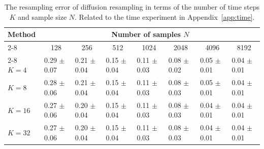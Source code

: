 \documentclass{article}
\begin{document}
\begin{table}[t!]
    \caption{The resampling error of diffusion resampling in terms of the number of time steps $K$ and sample size $N$. 
    Related to the time experiment in Appendix~\ref{app:time}. }
    \label{tbl:time-err-diffres}
    \centering
    \begin{tabular}{@{}llllllll@{}}
    \toprule
     \multirow{2}{*}{Method}  & \multicolumn{7}{c}{Number of samples $N$}                                                                                                                                               \\ \cmidrule(l){2-8} 
           & \multicolumn{1}{c}{128} & \multicolumn{1}{c}{256} & \multicolumn{1}{c}{512} & \multicolumn{1}{c}{1024} & \multicolumn{1}{c}{2048} & \multicolumn{1}{c}{4096} & \multicolumn{1}{c}{8192} \\ \cmidrule(l){2-8} 
    $K=4$  & 0.29 $\pm$ 0.07         & 0.21 $\pm$ 0.04         & 0.15 $\pm$ 0.04         & 0.11 $\pm$ 0.03          & 0.08 $\pm$ 0.02          & 0.05 $\pm$ 0.01          & 0.04 $\pm$ 0.01          \\
    $K=8$  & 0.28 $\pm$ 0.06         & 0.21 $\pm$ 0.04         & 0.15 $\pm$ 0.04         & 0.11 $\pm$ 0.03          & 0.08 $\pm$ 0.03          & 0.05 $\pm$ 0.01          & 0.04 $\pm$ 0.01          \\
    $K=16$ & 0.27 $\pm$ 0.06         & 0.20 $\pm$ 0.04         & 0.15 $\pm$ 0.04         & 0.11 $\pm$ 0.03          & 0.08 $\pm$ 0.03          & 0.04 $\pm$ 0.01          & 0.04 $\pm$ 0.01          \\
    $K=32$ & 0.27 $\pm$ 0.06         & 0.20 $\pm$ 0.04         & 0.15 $\pm$ 0.04         & 0.11 $\pm$ 0.03          & 0.08 $\pm$ 0.03          & 0.04 $\pm$ 0.01          & 0.04 $\pm$ 0.01          \\ \bottomrule
    \end{tabular}
\end{table}
\end{document}
